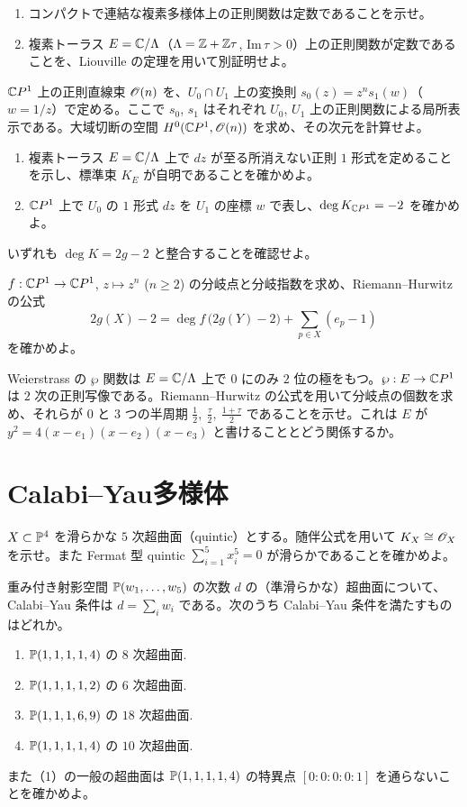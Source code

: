 \begin{enumerate}
  \item コンパクトで連結な複素多様体上の正則関数は定数であることを示せ。
  \item 複素トーラス $E=\mathbb{C}/\Lambda$（$\Lambda=\mathbb{Z}+\mathbb{Z}\tau$, $\mathrm{Im}\,\tau>0$）上の正則関数が定数であることを、Liouville の定理を用いて別証明せよ。
\end{enumerate}

$\mathbb{C} P^1$ 上の正則直線束 $\mathscr{O}(n)$ を、$U_0\cap U_1$ 上の変換則 $s_0(z)=z^n s_1(w)$（$w=1/z$）で定める。ここで $s_0$, $s_1$ はそれぞれ $U_0$, $U_1$ 上の正則関数による局所表示である。大域切断の空間 $H^0(\mathbb{C} P^1,\mathscr{O}(n))$ を求め、その次元を計算せよ。

\begin{enumerate}
  \item 複素トーラス $E=\mathbb{C}/\Lambda$ 上で $dz$ が至る所消えない正則 $1$ 形式を定めることを示し、標準束 $K_E$ が自明であることを確かめよ。
  \item $\mathbb{C} P^1$ 上で $U_0$ の $1$ 形式 $dz$ を $U_1$ の座標 $w$ で表し、$\deg K_{\mathbb{C} P^1}=-2$ を確かめよ。
\end{enumerate}
いずれも $\deg K=2g-2$ と整合することを確認せよ。

$f:\mathbb{C} P^1\to\mathbb{C} P^1$, $z\mapsto z^n$ ($n\geq 2$) の分岐点と分岐指数を求め、Riemann--Hurwitz の公式
\[
  2g(X)-2=\deg f\,\bigl(2g(Y)-2\bigr)+\sum_{p\in X}(e_p-1)
\]
を確かめよ。

Weierstrass の $\wp$ 関数は $E=\mathbb{C}/\Lambda$ 上で $0$ にのみ $2$ 位の極をもつ。$\wp:E\to\mathbb{C} P^1$ は $2$ 次の正則写像である。Riemann--Hurwitz の公式を用いて分岐点の個数を求め、それらが $0$ と $3$ つの半周期 $\tfrac12,\ \tfrac\tau2,\ \tfrac{1+\tau}{2}$ であることを示せ。これは $E$ が $y^2=4(x-e_1)(x-e_2)(x-e_3)$ と書けることとどう関係するか。

\section{Calabi--Yau多様体}

$X\subset\mathbb{P}^4$ を滑らかな $5$ 次超曲面（quintic）とする。随伴公式を用いて $K_X\cong\mathscr{O}_X$ を示せ。また Fermat 型 quintic $\sum_{i=1}^5 x_i^5=0$ が滑らかであることを確かめよ。

重み付き射影空間 $\mathbb{P}(w_1,\dots,w_5)$ の次数 $d$ の（準滑らかな）超曲面について、Calabi--Yau 条件は $d=\sum_i w_i$ である。次のうち Calabi--Yau 条件を満たすものはどれか。
\begin{enumerate}
  \item $\mathbb{P}(1,1,1,1,4)$ の $8$ 次超曲面.
  \item $\mathbb{P}(1,1,1,1,2)$ の $6$ 次超曲面.
  \item $\mathbb{P}(1,1,1,6,9)$ の $18$ 次超曲面.
  \item $\mathbb{P}(1,1,1,1,4)$ の $10$ 次超曲面.
\end{enumerate}
また（1）の一般の超曲面は $\mathbb{P}(1,1,1,1,4)$ の特異点 $[0:0:0:0:1]$ を通らないことを確かめよ。

